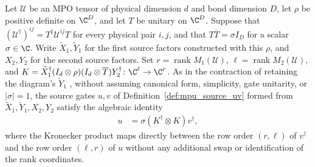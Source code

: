 \begin{lemma}
    \label{thm:mpug_inverse_cut_gate_identity}
    \leanok
    Let $\mathcal U$ be an MPO tensor of physical dimension $d$ and bond
    dimension $D$, let $\rho$ be positive definite on $\C^D$, and let
    $T$ be unitary on $\C^D$. Suppose that
    $(\mathcal U^\dagger)^{ij}=T^\dagger\mathcal U^{ij}T$ for every
    physical pair $i,j$, and that $T\overline T=\sigma I_D$ for a scalar
    $\sigma\in\C$. Write $\widetilde X_1,\widetilde Y_1$ for the first
    source factors constructed with this $\rho$, and $X_2,Y_2$ for the
    second source factors. Set $r=\operatorname{rank}M_1(\mathcal U)$,
    $\ell=\operatorname{rank}M_2(\mathcal U)$, and
    $K=\widetilde X_1^\dagger(I_d\otimes\rho)
        (I_d\otimes\overline T)Y_2^\dagger\colon\C^\ell\to\C^r$.
    As in the contraction of \cite[lines~5444--5487]{FrancoRubio2025MPUGauging}
    retaining the diagram's $\widetilde Y_1$
    \cite{gap:fbc25_inverse_compatible_tilde_omission}, without assuming
    canonical form, simplicity, gate unitarity, or $|\sigma|=1$, the source
    gates $u,v$ of Definition~\ref{def:mpu_source_uv} formed from
    $\widetilde X_1,\widetilde Y_1,X_2,Y_2$ satisfy the algebraic identity
    \begin{align}
        u & =\sigma(K^\dagger\otimes K)v^\dagger,
    \end{align}
    where the Kronecker product maps directly between the row order $(r,\ell)$
    of $v^\dagger$ and the row order $(\ell,r)$ of $u$ without any additional
    swap or identification of the rank coordinates.
\end{lemma}
